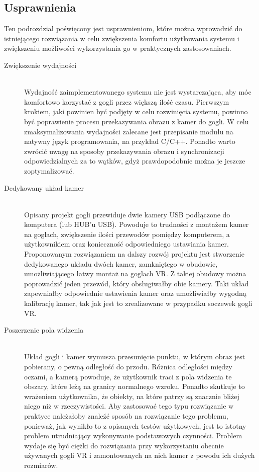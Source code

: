 \documentclass[a4paper,11pt,twoside]{report}
\theoremstyle{definition}
\begin{document}
\subsection{Usprawnienia}

Ten podrozdział poświęcony jest usprawnieniom, które można wprowadzić do istniejącego rozwiązania w celu zwiększenia komfortu użytkowania systemu i zwiększeniu możliwości wykorzystania go w praktycznych zastosowaniach.

\begin{description}
\item [Zwiększenie wydajności] \hfill \\
Wydajność zaimplementowanego systemu nie jest wystarczająca, aby móc komfortowo korzystać z gogli przez większą ilość czasu. Pierwszym krokiem, jaki powinien być podjęty w celu rozwinięcia systemu, powinno być poprawienie procesu przekazywania obrazu z kamer do gogli. W celu zmaksymalizowania wydajności zalecane jest przepisanie modułu na natywny język programowania, na przykład C/C++. Ponadto warto zwrócić uwagę na sposoby przekazywania obrazu i synchronizacji odpowiedzialnych za to wątków, gdyż prawdopodobnie można je jeszcze zoptymalizować.

\item [Dedykowany układ kamer] \hfill \\
Opisany projekt gogli przewiduje dwie kamery USB podłączone do komputera (lub HUB'u USB). Powoduje to trudności z montażem kamer na goglach, zwiększenie ilości przewodów pomiędzy komputerem, a użytkownikiem oraz konieczność odpowiedniego ustawiania kamer. Proponowanym rozwiązaniem na dalszy rozwój projektu jest stworzenie dedykowanego układu dwóch kamer, zamkniętego w obudowie, umożliwiającego łatwy montaż na goglach VR. Z takiej obudowy można poprowadzić jeden przewód, który obsługiwałby obie kamery. Taki układ zapewniałby odpowiednie ustawienia kamer oraz umożliwiałby wygodną kalibrację kamer, tak jak jest to zrealizowane w przypadku soczewek gogli VR.

\item [Poszerzenie pola widzenia] \hfill \\
Układ gogli i kamer wymusza przesunięcie punktu, w którym obraz jest pobierany, o pewną odległość do przodu. Różnica odległości między oczami, a kamerą powoduje, że użytkownik traci z pola widzenia te obszary, które leżą na granicy normalnego wzroku. Ponadto skutkuje to wrażeniem użytkownika, że obiekty, na które patrzy są znacznie bliżej niego niż w rzeczywistości. Aby zastosować tego typu rozwiązanie w praktyce należałoby znaleźć sposób na rozwiązanie tego problemu, ponieważ, jak wynikło to z opisanych testów użytkowych, jest to istotny problem utrudniający wykonywanie podstawowych czynności. Problem wydaje się być ciężki do rozwiązania przy wykorzystaniu obecnie używanych gogli VR i zamontowanych na nich kamer z powodu ich dużych rozmiarów.
\end{description}
\end{document}
